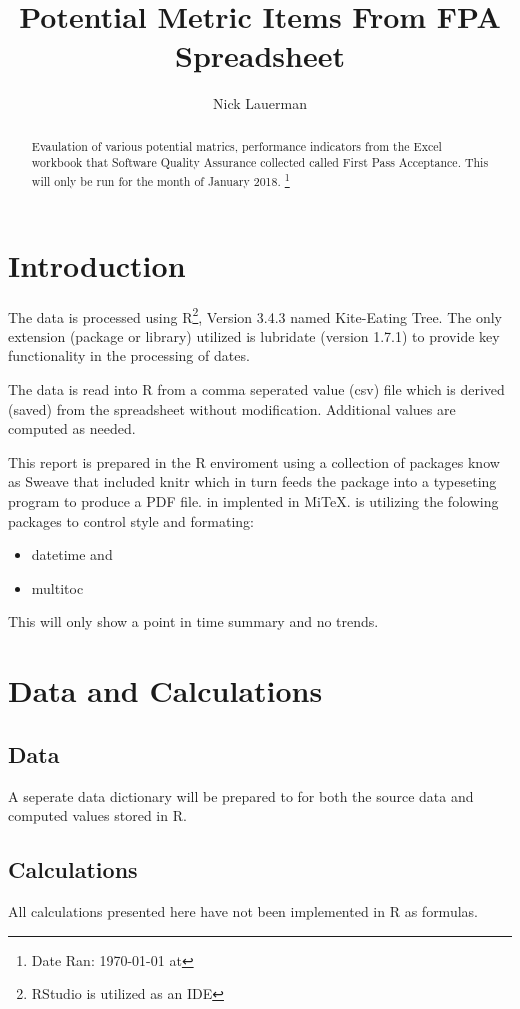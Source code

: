 \documentclass{article}
\title{Potential Metric Items From FPA Spreadsheet}
\author{Nick Lauerman}
\date{}
\begin{document}

\maketitle

\begin{abstract}
Evaulation of various potential matrics, performance indicators from the Excel
workbook that Software Quality Assurance collected called First Pass
Acceptance. This will only be run for the month of January 2018.
\footnote{Date Ran: \today{} at \currenttime}
\end{abstract}

\tableofcontents

\section{Introduction}
The data is processed using R\footnote{RStudio is utilized as an IDE}, Version
3.4.3 named Kite-Eating Tree. The only extension (package or library) utilized is
lubridate (version 1.7.1) to provide key functionality in the processing of dates.

The data is read into R from a comma seperated value (csv) file which is derived (saved)
from the spreadsheet without modification. Additional values are computed as needed.

This report is prepared in the R enviroment using a collection of packages know as
Sweave that included knitr which in turn feeds the package into \LaTeXe{} a typeseting
program to produce a PDF file. \LaTeXe{} in implented in Mi\TeX. \LaTeXe{} is utilizing
the folowing packages to control style and formating:
\begin{itemize}
\item datetime and
\item multitoc
\end{itemize}

This will only show a point in time summary and no trends.

\section{Data and Calculations}
\subsection{Data}
A seperate data dictionary will be prepared to for both the source data
and computed values stored in R.

\subsection{Calculations}
All calculations presented here have not been implemented in R as formulas.
\end{document}
